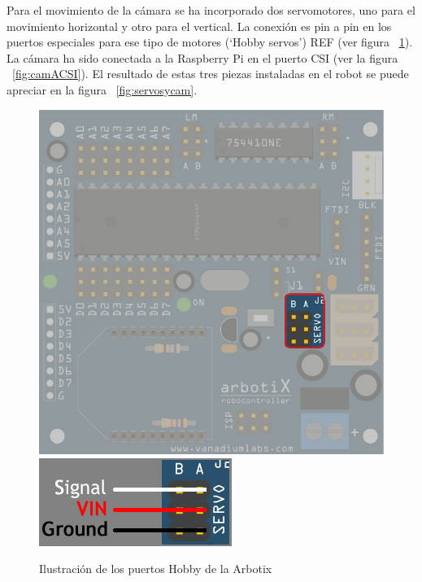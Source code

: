 Para el movimiento de la cámara se ha incorporado dos servomotores, uno para el movimiento horizontal y otro para el vertical. La conexión es pin a pin en los puertos especiales para ese tipo de motores (‘Hobby servos’) REF (ver figura ~\ref{fig:puertosHobby}). La cámara ha sido conectada a la Raspberry Pi en el puerto CSI (ver la figura ~\ref{fig:camACSI}). El resultado de estas tres piezas instaladas en el robot se puede apreciar en la figura ~\ref{fig:servosycam}.

\begin{figure}[hbtp]
\centering

\includegraphics[scale=0.2]{imagenes/arbotix_hobby_servo.jpg}
\includegraphics[scale=0.4]{imagenes/arbotix_hobbyservos_lines.jpg}
\caption{Ilustración de los puertos Hobby de la Arbotix}
\label{fig:puertosHobby}
\end{figure}

